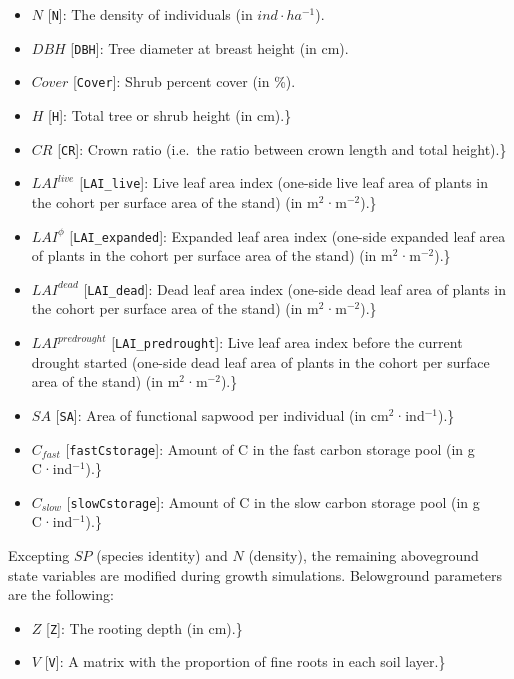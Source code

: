 \documentclass[]{book}
\providecommand{\tightlist}{%
  \setlength{\itemsep}{0pt}\setlength{\parskip}{0pt}}
\begin{document}
\begin{itemize}
\tightlist
\item
  \(N\) {[}\texttt{N}{]}: The density of individuals (in
  \(ind · ha^{-1}\)).
\item
  \(DBH\) {[}\texttt{DBH}{]}: Tree diameter at breast height (in cm).
\item
  \(Cover\) {[}\texttt{Cover}{]}: Shrub percent cover (in \%).
\item
  \(H\) {[}\texttt{H}{]}: Total tree or shrub height (in cm).\}
\item
  \(CR\) {[}\texttt{CR}{]}: Crown ratio (i.e.~the ratio between crown
  length and total height).\}
\item
  \(LAI^{live}\) {[}\texttt{LAI\_live}{]}: Live leaf area index
  (one-side live leaf area of plants in the cohort per surface area of
  the stand) (in m\(^2\)·m\(^{-2}\)).\}
\item
  \(LAI^{\phi}\) {[}\texttt{LAI\_expanded}{]}: Expanded leaf area index
  (one-side expanded leaf area of plants in the cohort per surface area
  of the stand) (in m\(^2\)·m\(^{-2}\)).\}
\item
  \(LAI^{dead}\) {[}\texttt{LAI\_dead}{]}: Dead leaf area index
  (one-side dead leaf area of plants in the cohort per surface area of
  the stand) (in m\(^2\)·m\(^{-2}\)).\}
\item
  \(LAI^{predrought}\) {[}\texttt{LAI\_predrought}{]}: Live leaf area
  index before the current drought started (one-side dead leaf area of
  plants in the cohort per surface area of the stand) (in
  m\(^2\)·m\(^{-2}\)).\}
\item
  \(SA\) {[}\texttt{SA}{]}: Area of functional sapwood per individual
  (in cm\(^2\)·ind\(^{-1}\)).\}
\item
  \(C_{fast}\) {[}\texttt{fastCstorage}{]}: Amount of C in the fast
  carbon storage pool (in g C·ind\(^{-1}\)).\}
\item
  \(C_{slow}\) {[}\texttt{slowCstorage}{]}: Amount of C in the slow
  carbon storage pool (in g C·ind\(^{-1}\)).\}
\end{itemize}

Excepting \(SP\) (species identity) and \(N\) (density), the remaining
aboveground state variables are modified during growth simulations.
Belowground parameters are the following:

\begin{itemize}
\tightlist
\item
  \(Z\) {[}\texttt{Z}{]}: The rooting depth (in cm).\}
\item
  \(V\) {[}\texttt{V}{]}: A matrix with the proportion of fine roots in
  each soil layer.\}
\end{itemize}
\end{document}
